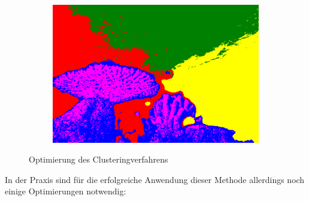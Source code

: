 \begin{figure}[h!]
\begin{subfigure}[t]{0.32\textwidth}
		\includegraphics[width=\textwidth,keepaspectratio]{images/gen/GEN_tsugf_filterbank_101027_blur_norm_spatial_color.png}
	\end{subfigure}
	\hfill
	\begin{subfigure}[t]{0.32\textwidth}
		\hfill
	\end{subfigure}
	\caption{Optimierung des Clusteringverfahrens}
	\label{fig:tsugf_optim}
\end{figure}

In der Praxis sind für die erfolgreiche Anwendung dieser Methode allerdings noch einige Optimierungen notwendig: \cite{mathworks_15}

